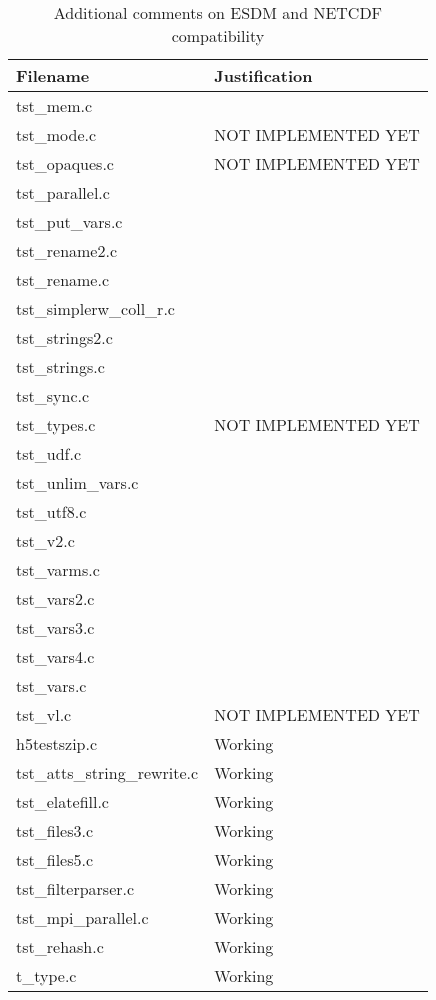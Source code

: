 \begin{table}[H]
\centering
\begin{tabular}{|l|l|}
\hline
Filename & Justification \\ \hline \hline
tst\_mem.c   &       \\ \hline
tst\_mode.c   &   NOT IMPLEMENTED YET    \\ \hline
tst\_opaques.c   &  NOT IMPLEMENTED YET     \\ \hline
tst\_parallel.c   &       \\ \hline
tst\_put\_vars.c   &       \\ \hline
tst\_rename2.c   &       \\ \hline
tst\_rename.c   &       \\ \hline
tst\_simplerw\_coll\_r.c   &       \\ \hline
tst\_strings2.c   &       \\ \hline
tst\_strings.c   &       \\ \hline
tst\_sync.c   &       \\ \hline
tst\_types.c   &  NOT IMPLEMENTED YET     \\ \hline
tst\_udf.c   &       \\ \hline
tst\_unlim\_vars.c   &       \\ \hline
tst\_utf8.c   &       \\ \hline
tst\_v2.c   &       \\ \hline
tst\_varms.c   &       \\ \hline
tst\_vars2.c   &       \\ \hline
tst\_vars3.c   &       \\ \hline
tst\_vars4.c   &       \\ \hline
tst\_vars.c   &       \\ \hline
tst\_vl.c   &   NOT IMPLEMENTED YET    \\ \hline
h5testszip.c   & Working   \\ \hline
tst\_atts\_string\_rewrite.c   & Working   \\ \hline
tst\_elatefill.c   & Working   \\ \hline
tst\_files3.c   & Working   \\ \hline
tst\_files5.c   & Working   \\ \hline
tst\_filterparser.c   & Working   \\ \hline
tst\_mpi\_parallel.c   & Working   \\ \hline
tst\_rehash.c   & Working   \\ \hline
t\_type.c   & Working   \\ \hline
\end{tabular}
\caption{Additional comments on ESDM and NETCDF compatibility}
\end{table}

